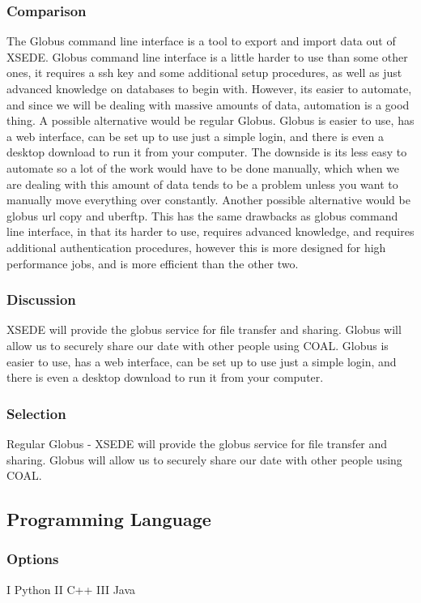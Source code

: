 \documentclass[10pt,draftclsnofoot,onecolumn,journal,compsoc]{IEEEtran}
\begin{document}
\subsubsection{Comparison}
The Globus command line interface is a tool to export and import data out of XSEDE. Globus command line
interface is a little harder to use than some other ones, it requires a ssh key and some additional setup procedures,
as well as just advanced knowledge on databases to begin with. However, its easier to automate, and since we
will be dealing with massive amounts of data, automation is a good thing. \cite{4}
A possible alternative would be regular Globus. Globus is easier to use, has a web interface, can be set up to
use just a simple login, and there is even a desktop download to run it from your computer. The downside is its
less easy to automate so a lot of the work would have to be done manually, which when we are dealing with
this amount of data tends to be a problem unless you want to manually move everything over constantly.
Another possible alternative would be globus url copy and uberftp. This has the same drawbacks as globus
command line interface, in that its harder to use, requires advanced knowledge, and requires additional authentication
procedures, however this is more designed for high performance jobs, and is more efficient than the other
two.

\subsubsection{Discussion}
\noindent XSEDE will provide the globus service for file transfer and sharing. Globus will allow us to securely share our date with other people using COAL. Globus is easier to use, has a web interface, can be set up to use just a simple login, and there is even a desktop download to run it from your computer.

\subsubsection{Selection}
Regular Globus - XSEDE will provide the globus service for file transfer and sharing. Globus will allow us to securely share our date with other people using COAL. \cite{20}

\subsection{Programming Language}

\subsubsection{Options}
\noindent I Python \newline
\noindent II C++ \newline
\noindent III Java
\end{document}

